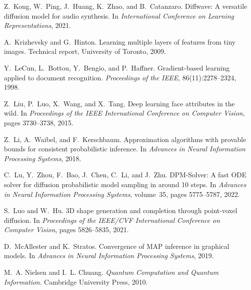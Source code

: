 \documentclass[11pt,letterpaper]{article}
\begin{document}
\begin{thebibliography}{99}
Z.~Kong, W.~Ping, J.~Huang, K.~Zhao, and B.~Catanzaro.
\newblock Diffwave: A versatile diffusion model for audio synthesis.
\newblock In \emph{International Conference on Learning Representations}, 2021.

A.~Krizhevsky and G.~Hinton.
\newblock Learning multiple layers of features from tiny images.
\newblock Technical report, University of Toronto, 2009.

Y.~LeCun, L.~Bottou, Y.~Bengio, and P.~Haffner.
\newblock Gradient-based learning applied to document recognition.
\newblock \emph{Proceedings of the IEEE}, 86(11):2278--2324, 1998.

Z.~Liu, P.~Luo, X.~Wang, and X.~Tang.
\newblock Deep learning face attributes in the wild.
\newblock In \emph{Proceedings of the IEEE International Conference on Computer Vision}, pages 3730--3738, 2015.

Z.~Li, A.~Waibel, and F.~Kerschbaum.
\newblock Approximation algorithms with provable bounds for consistent probabilistic inference.
\newblock In \emph{Advances in Neural Information Processing Systems}, 2018.

C.~Lu, Y.~Zhou, F.~Bao, J.~Chen, C.~Li, and J.~Zhu.
\newblock DPM-Solver: A fast ODE solver for diffusion probabilistic model sampling in around 10 steps.
\newblock In \emph{Advances in Neural Information Processing Systems}, volume~35, pages 5775--5787, 2022.

S.~Luo and W.~Hu.
\newblock 3D shape generation and completion through point-voxel diffusion.
\newblock In \emph{Proceedings of the IEEE/CVF International Conference on Computer Vision}, pages 5826--5835, 2021.

D.~McAllester and K.~Stratos.
\newblock Convergence of MAP inference in graphical models.
\newblock In \emph{Advances in Neural Information Processing Systems}, 2019.

M.~A. Nielsen and I.~L. Chuang.
\newblock \emph{Quantum Computation and Quantum Information}.
\newblock Cambridge University Press, 2010.


\end{thebibliography}
\end{document}
